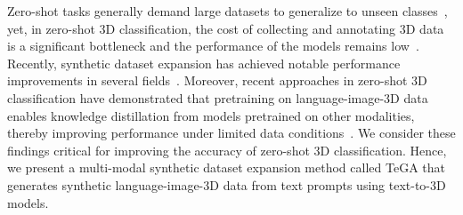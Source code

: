 Zero-shot tasks generally demand large datasets to generalize to unseen classes~\cite{radford2021learning}, yet, in zero-shot 3D classification, the cost of collecting and annotating 3D data is a significant bottleneck and the performance of the models remains low~\cite{liu2024openshape, zhou2023uni3d, gao2024sculpting}. 
Recently, synthetic dataset expansion has achieved notable performance improvements in several fields~\cite{isola2022when, sariyildiz2023fake}.
Moreover, recent approaches in zero-shot 3D classification have demonstrated that pretraining on language-image-3D data enables knowledge distillation from models pretrained on other modalities, thereby improving performance under limited data conditions~\cite{qi2023contrast, hegde2023clip, huang2023clip2point, xue2024ulip, liu2024openshape}.
We consider these findings critical for improving the accuracy of zero-shot 3D classification. Hence, we present a multi-modal synthetic dataset expansion method called TeGA that generates synthetic language-image-3D data from text prompts using text-to-3D models. 

